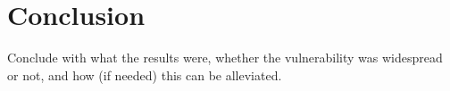 \chapter{Conclusion}
Conclude with what the results were, whether the vulnerability was widespread or not, and how (if needed) this can be alleviated.